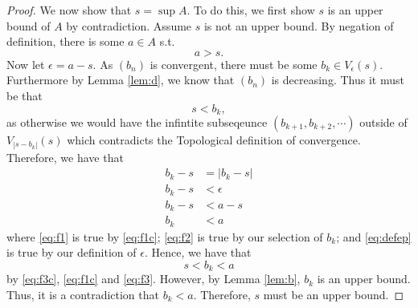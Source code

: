 \documentclass[10pt]{article}
\begin{document}
\begin{proof}
    We now show that $s = \sup A.$ To do this, we first show $s$ is an upper bound of $A$ by contradiction. Assume $s$ is not an upper bound. By negation of definition, there is some $a\in A$ s.t. 
    \begin{equation} \label{eq:f3c}
        a > s.        
    \end{equation}
    Now let $\epsilon = a - s.$ As $(b_n)$ is convergent, there must be some $b_k \in V_\epsilon(s).$ Furthermore by Lemma \ref{lem:d}, we know that $(b_n)$ is decreasing. Thus it must be that 
    \begin{equation} \label{eq:f1c}
        s<b_k,
    \end{equation}
    as otherwise we would have the infintite subseqeunce $(b_{k+1}, b_{k+2},\cdots)$ outside of $V_{|s-b_k|}(s)$ which contradicts the Topological definition of convergence. Therefore, we have that
    \begin{align}
        b_k - s &= |b_k-s| \label{eq:f1}\\
        b_k - s  &< \epsilon \label{eq:f2}\\
        b_k-s&< a - s \label{eq:defep}\\
        b_k &< a \label{eq:f3}
    \end{align}
    where \eqref{eq:f1} is true by \eqref{eq:f1c}; \eqref{eq:f2} is true by our selection of $b_k$; and \eqref{eq:defep} is true by our definition of $\epsilon.$
    Hence, we have that \[s<b_k<a\] by \eqref{eq:f3c}, \eqref{eq:f1c} and \eqref{eq:f3}. However, by Lemma \ref{lem:b}, $b_k$ is an upper bound. Thus, it is a contradiction that $b_k<a$. Therefore, $s$ must be an upper bound.


\end{proof}
\end{document}
